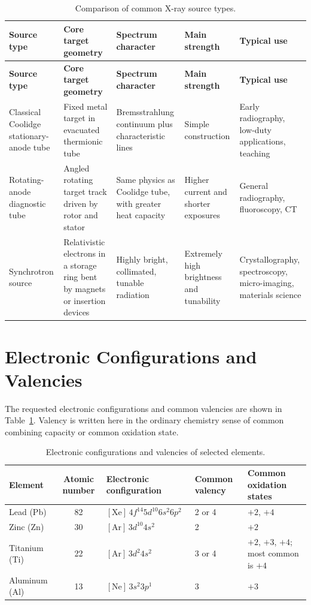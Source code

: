 \documentclass[12pt]{article}
\begin{document}
\begin{longtable}{p{} p{} p{} p{} p{}}
\caption{Comparison of common X-ray source types.}\\
\toprule
\textbf{Source type} & \textbf{Core target geometry} & \textbf{Spectrum character} & \textbf{Main strength} & \textbf{Typical use}\\
\midrule
\endfirsthead

\toprule
\textbf{Source type} & \textbf{Core target geometry} & \textbf{Spectrum character} & \textbf{Main strength} & \textbf{Typical use}\\
\midrule
\endhead

Classical Coolidge stationary-anode tube & Fixed metal target in evacuated thermionic tube & Bremsstrahlung continuum plus characteristic lines & Simple construction & Early radiography, low-duty applications, teaching\\

Rotating-anode diagnostic tube & Angled rotating target track driven by rotor and stator & Same physics as Coolidge tube, with greater heat capacity & Higher current and shorter exposures & General radiography, fluoroscopy, CT\\

Synchrotron source & Relativistic electrons in a storage ring bent by magnets or insertion devices & Highly bright, collimated, tunable radiation & Extremely high brightness and tunability & Crystallography, spectroscopy, micro-imaging, materials science\\
\bottomrule
\end{longtable}

\section{Electronic Configurations and Valencies}

The requested electronic configurations and common valencies are shown in Table~\ref{tab:configs}. Valency is written here in the ordinary chemistry sense of common combining capacity or common oxidation state.

\begin{table}[h!]
\centering
\caption{Electronic configurations and valencies of selected elements.}
\label{tab:configs}
\begin{tabularx}{\textwidth}{l c X l X}
\toprule
\textbf{Element} & \textbf{Atomic number} & \textbf{Electronic configuration} & \textbf{Common valency} & \textbf{Common oxidation states}\\
\midrule
Lead (Pb) & 82 & $[\mathrm{Xe}]\,4f^{14}5d^{10}6s^2 6p^2$ & 2 or 4 & $+2$, $+4$\\
Zinc (Zn) & 30 & $[\mathrm{Ar}]\,3d^{10}4s^2$ & 2 & $+2$\\
Titanium (Ti) & 22 & $[\mathrm{Ar}]\,3d^2 4s^2$ & 3 or 4 & $+2$, $+3$, $+4$; most common is $+4$\\
Aluminum (Al) & 13 & $[\mathrm{Ne}]\,3s^2 3p^1$ & 3 & $+3$\\
\bottomrule
\end{tabularx}
\end{table}
\end{document}
